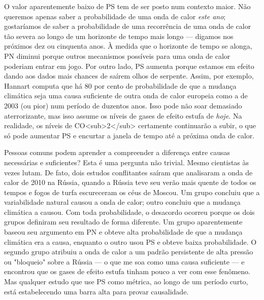 \documentclass[11pt,a5paper,twoside]{book}
\begin{document}
O valor aparentemente baixo de PS tem de ser posto num contexto maior. Não queremos apenas saber a probabilidade de uma onda de calor \textit{este ano}; gostaríamos de saber a probabilidade de uma recorrência de uma onda de calor tão severa ao longo de um horizonte de tempo mais longo — digamos nos próximos dez ou cinquenta anos. À medida que o horizonte de tempo se alonga, PN diminui porque outros mecanismos possíveis para uma onda de calor poderiam entrar em jogo. Por outro lado, PS aumenta porque estamos em efeito dando aos dados mais chances de saírem olhos de serpente. Assim, por exemplo, Hannart computa que há 80 por cento de probabilidade de que a mudança climática seja uma causa suficiente de outra onda de calor europeia como a de 2003 (ou pior) num período de duzentos anos. Isso pode não soar demasiado aterrorizante, mas isso assume os níveis de gases de efeito estufa de \textit{hoje}. Na realidade, os níveis de CO<sub>2</sub> certamente continuarão a subir, o que só pode aumentar PS e encurtar a janela de tempo até a próxima onda de calor.

Pessoas comuns podem aprender a compreender a diferença entre causas necessárias e suficientes? Esta é uma pergunta não trivial. Mesmo cientistas às vezes lutam. De fato, dois estudos conflitantes saíram que analisaram a onda de calor de 2010 na Rússia, quando a Rússia teve seu verão mais quente de todos os tempos e fogos de turfa escureceram os céus de Moscou. Um grupo concluiu que a variabilidade natural causou a onda de calor; outro concluiu que a mudança climática a causou. Com toda probabilidade, o desacordo ocorreu porque os dois grupos definiram seu resultado de forma diferente. Um grupo aparentemente baseou seu argumento em PN e obteve alta probabilidade de que a mudança climática era a causa, enquanto o outro usou PS e obteve baixa probabilidade. O segundo grupo atribuiu a onda de calor a um padrão persistente de alta pressão ou "bloqueio" sobre a Rússia — o que me soa como uma causa suficiente — e encontrou que os gases de efeito estufa tinham pouco a ver com esse fenômeno. Mas qualquer estudo que use PS como métrica, ao longo de um período curto, está estabelecendo uma barra alta para provar causalidade.
\end{document}
